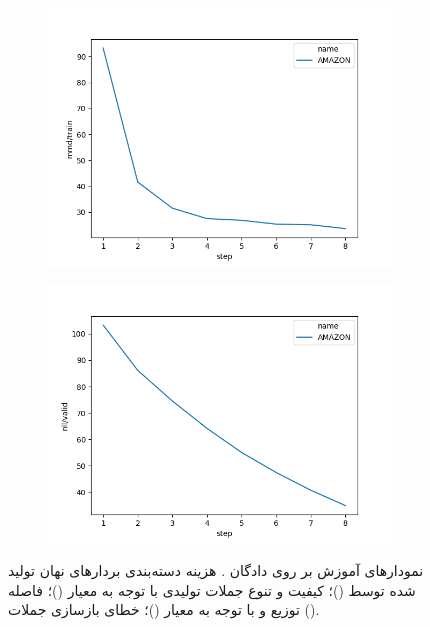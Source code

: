 \begin{figure}[H]
\begin{subfigure}{0.3\textheight}
		\caption{}
		\label{fig:chap4:amazon_jaccard}
	\end{subfigure}
	\begin{subfigure}{0.3\textheight}
		\centering
		\includegraphics[width=1.\textwidth]{images/figs/2020_01_03__19_09_40__mmd.png}
		\caption{}
		\label{fig:chap4:amazon_mmd}
	\end{subfigure}
	\begin{subfigure}{0.3\textheight}
		\centering
		\includegraphics[width=1.\textwidth]{images/figs/2020_01_03__19_09_40__nll.png}
		\caption{}
		\label{fig:chap4:amazon_nll}
	\end{subfigure}
	\caption{
		نمودار‌های آموزش \wae{} بر روی دادگان \amazon{}.
		هزینه دسته‌بندی بردار‌های نهان تولید شده توسط \encoder{}
		()؛
		کیفیت و تنوع جملات تولیدی با توجه به معیار \jaccard{}
		()؛
		فاصله توزیع \marginal{} \encoder{} و \priordist{} با توجه به معیار \mmd{}
		()؛
		خطای بازسازی جملات
		().
	}
	\label{fig:chap4:amazon_cond}
\end{figure}
